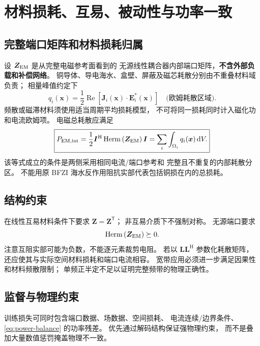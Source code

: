 \section{材料损耗、互易、被动性与功率一致}\label{sec:loss}
\subsection{完整端口矩阵和材料损耗归属}
设 \(\bm Z_{\rm EM}\) 是从完整电磁参考面看到的
无源线性耦合器内部端口矩阵，\textbf{不含外部负载和补偿网络}。
铜导体、导电海水、盒壁、屏蔽及磁芯耗散分别由不重叠材料域负责；
相量峰值约定下
\begin{equation}
q_i(\bm x)=\frac12\operatorname{Re}
[\bm J_i(\bm x)\cdot\bm E_i^*(\bm x)]
\quad\text{(欧姆耗散区域)}.
\end{equation}
频散或磁滞材料须使用适当周期平均损耗模型，
不可将同一损耗同时计入磁化功和电流欧姆项。
电磁总耗散应满足
\begin{equation}
\boxed{
P_{\rm EM,int}=\frac12\bm I^{\mathrm H}
\operatorname{Herm}\left(\bm Z_{\rm EM}\right)\bm I
=\sum_i\int_{\Omega_i}q_i(\bm x)\,\mathrm dV.
}\label{eq:power-balance}
\end{equation}
该等式成立的条件是两侧采用相同电流/端口参考和
完整且不重复的内部耗散分区。
不能用原 BFZI 海水反作用阻抗实部代表包括铜损在内的总损耗。

\subsection{结构约束}
在线性互易材料条件下要求 \(\bm Z=\bm Z^{\mathsf T}\)；
非互易介质下不强制对称。
无源端口要求
\[
\operatorname{Herm}\left(\bm Z_{\rm EM}\right)\succeq0.
\]
注意互阻实部可能为负数，不能逐元素裁剪电阻。
若以 \(\bm L\bm L^{\mathrm H}\) 参数化耗散矩阵，
还应使其与实际空间材料损耗和端口电流相容。
宽带应用必须进一步满足因果性和材料频散限制；
单频正半定不足以证明完整频带的物理正确性。

\subsection{监督与物理约束}
训练损失可同时包含端口数据、场数据、空间损耗、
电流连续/边界条件、\eqref{eq:power-balance} 的功率残差。
优先通过解码结构保证强物理约束，
而不是叠加大量数值惩罚掩盖物理不一致。
